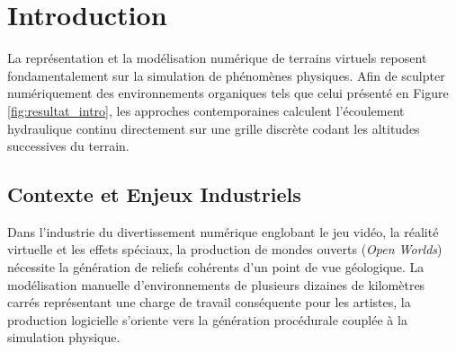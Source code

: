 \documentclass[10pt,twocolumn,a4paper]{article}
\begin{document}
\begin{abstract}
    La génération procédurale de terrains virtuels réalistes nécessite la simulation de phénomènes physiques complexes s'étalant sur des temps géologiques. Ce document présente la conception et l'implémentation sur carte graphique (GPU), via la technologie des Compute Shaders, du modèle d'érosion hydraulique initialement proposé par Mei et al. \cite{MDH07}. Afin de pallier le manque de détails géométriques inhérent à ces approches, tel que mis en évidence par Schott et al. \cite{SGG24}, nous avons étendu cette architecture en y intégrant une modélisation avancée de l'érosion thermique (éboulements gravitationnels), en nous appuyant sur les travaux de Jákó et Szirmay-Kalos \cite{Jako11}. Nos résultats démontrent qu'il est possible d'augmenter significativement le réalisme des pentes abruptes et la distribution sédimentaire, tout en maintenant des performances d'exécution élevées (avoisinant les 960 FPS), prouvant ainsi la viabilité de ce modèle couplé pour des applications interactives exigeantes.
\end{abstract}

\section{Introduction}\label{sec:intro}

La représentation et la modélisation numérique de terrains virtuels reposent fondamentalement sur la simulation de phénomènes physiques. Afin de sculpter numériquement des environnements organiques tels que celui présenté en Figure \ref{fig:resultat_intro}, les approches contemporaines calculent l'écoulement hydraulique continu directement sur une grille discrète codant les altitudes successives du terrain.

\subsection{Contexte et Enjeux Industriels}\label{subsec:contexte}
Dans l'industrie du divertissement numérique englobant le jeu vidéo, la réalité virtuelle et les effets spéciaux, la production de mondes ouverts (\textit{Open Worlds}) nécessite la génération de reliefs cohérents d'un point de vue géologique. La modélisation manuelle d'environnements de plusieurs dizaines de kilomètres carrés représentant une charge de travail conséquente pour les artistes, la production logicielle s'oriente vers la génération procédurale couplée à la simulation physique.
\end{document}
